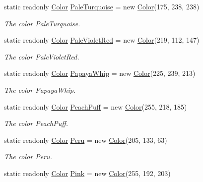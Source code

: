 \begin{DoxyCompactItemize}
static readonly \hyperlink{struct_tri_devs_1_1_tri_engine_1_1_color}{Color} \hyperlink{struct_tri_devs_1_1_tri_engine_1_1_color_a4f3ac681fa604a37a8dc798e42a2f471}{Pale\-Turquoise} = new \hyperlink{struct_tri_devs_1_1_tri_engine_1_1_color}{Color}(175, 238, 238)
\begin{DoxyCompactList}\small\item\em The color Pale\-Turquoise. \end{DoxyCompactList}\item 
static readonly \hyperlink{struct_tri_devs_1_1_tri_engine_1_1_color}{Color} \hyperlink{struct_tri_devs_1_1_tri_engine_1_1_color_a57b970b634374d67e49f4bab55da3c11}{Pale\-Violet\-Red} = new \hyperlink{struct_tri_devs_1_1_tri_engine_1_1_color}{Color}(219, 112, 147)
\begin{DoxyCompactList}\small\item\em The color Pale\-Violet\-Red. \end{DoxyCompactList}\item 
static readonly \hyperlink{struct_tri_devs_1_1_tri_engine_1_1_color}{Color} \hyperlink{struct_tri_devs_1_1_tri_engine_1_1_color_a9414e6848167fdd5138296403e6edf0a}{Papaya\-Whip} = new \hyperlink{struct_tri_devs_1_1_tri_engine_1_1_color}{Color}(225, 239, 213)
\begin{DoxyCompactList}\small\item\em The color Papaya\-Whip. \end{DoxyCompactList}\item 
static readonly \hyperlink{struct_tri_devs_1_1_tri_engine_1_1_color}{Color} \hyperlink{struct_tri_devs_1_1_tri_engine_1_1_color_a52a4639ca897c18619a325e4146f329d}{Peach\-Puff} = new \hyperlink{struct_tri_devs_1_1_tri_engine_1_1_color}{Color}(255, 218, 185)
\begin{DoxyCompactList}\small\item\em The color Peach\-Puff. \end{DoxyCompactList}\item 
static readonly \hyperlink{struct_tri_devs_1_1_tri_engine_1_1_color}{Color} \hyperlink{struct_tri_devs_1_1_tri_engine_1_1_color_a4f396155a6163d435665b6d72870ed95}{Peru} = new \hyperlink{struct_tri_devs_1_1_tri_engine_1_1_color}{Color}(205, 133, 63)
\begin{DoxyCompactList}\small\item\em The color Peru. \end{DoxyCompactList}\item 
static readonly \hyperlink{struct_tri_devs_1_1_tri_engine_1_1_color}{Color} \hyperlink{struct_tri_devs_1_1_tri_engine_1_1_color_af5c03ddcbc013bd5e09d20f8fcd62a71}{Pink} = new \hyperlink{struct_tri_devs_1_1_tri_engine_1_1_color}{Color}(255, 192, 203)

\end{DoxyCompactItemize}
